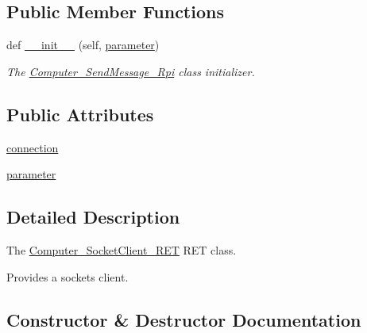 \subsection*{Public Member Functions}
\begin{DoxyCompactItemize}
\item 
def \hyperlink{classRET__socket_1_1Computer__SocketClient__RET_a297f3b1ee42e9ff40c0ec84bb5996ea5}{\+\_\+\+\_\+init\+\_\+\+\_\+} (self, \hyperlink{classRET__socket_1_1Computer__SocketClient__RET_a0d71b5c1dcca8d3fee88d6a11d3e2071}{parameter})
\begin{DoxyCompactList}\small\item\em The \hyperlink{classRET__socket_1_1Computer__SendMessage__Rpi}{Computer\+\_\+\+Send\+Message\+\_\+\+Rpi} class initializer. \end{DoxyCompactList}\end{DoxyCompactItemize}
\subsection*{Public Attributes}
\begin{DoxyCompactItemize}
\item 
\hyperlink{classRET__socket_1_1Computer__SocketClient__RET_a10275a078bd1abcbebc206cc5d19e18b}{connection}
\item 
\hyperlink{classRET__socket_1_1Computer__SocketClient__RET_a0d71b5c1dcca8d3fee88d6a11d3e2071}{parameter}
\end{DoxyCompactItemize}


\subsection{Detailed Description}
The \hyperlink{classRET__socket_1_1Computer__SocketClient__RET}{Computer\+\_\+\+Socket\+Client\+\_\+\+R\+ET} R\+ET class. 

Provides a socket\textquotesingle{}s client. 

\subsection{Constructor \& Destructor Documentation}
\mbox{\label{classRET__socket_1_1Computer__SocketClient__RET_a297f3b1ee42e9ff40c0ec84bb5996ea5}} 
